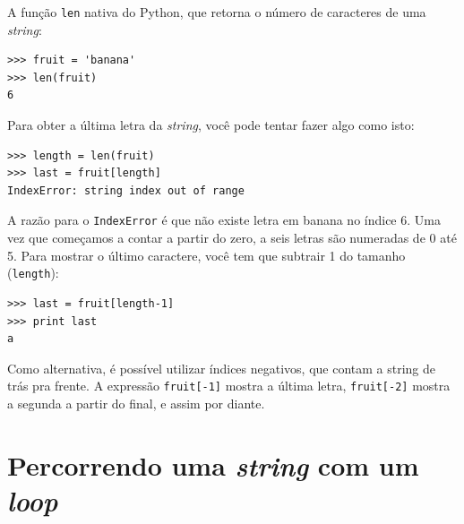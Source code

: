 {%
A função {\tt len} nativa do Python, que retorna o número de caracteres de
uma {\it string}:

\beforeverb
\begin{verbatim}
>>> fruit = 'banana'
>>> len(fruit)
6
\end{verbatim}
\afterverb
%
%
Para obter a última letra da {\it string}, você pode tentar fazer algo como
isto:


\beforeverb
\begin{verbatim}
>>> length = len(fruit)
>>> last = fruit[length]
IndexError: string index out of range
\end{verbatim}
\afterverb
%
%
A razão para o {\tt IndexError} é que não existe letra em banana no índice 6.
Uma vez que começamos a contar a partir do zero, a seis letras são numeradas
de 0 até 5. Para mostrar o último caractere, você tem que subtrair 1 do 
tamanho ({\tt length}):

\beforeverb
\begin{verbatim}
>>> last = fruit[length-1]
>>> print last
a
\end{verbatim}
\afterverb
%
%
Como alternativa, é possível utilizar índices negativos, que contam a string
de trás pra frente. A expressão {\tt fruit[-1]} mostra a última letra, 
{\tt fruit[-2]} mostra a segunda a partir do final, e assim por diante.


\label{for}
\section{Percorrendo uma {\it string} com um {\it loop} }

}
